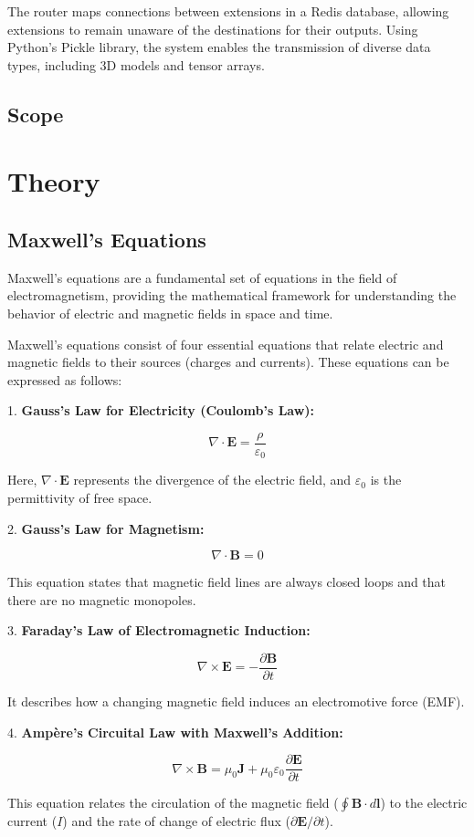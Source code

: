 \documentclass[11pt, a4paper, titlepage]{article}
\begin{document}
The router maps connections between extensions in a Redis database, allowing extensions to remain unaware of the destinations for their outputs. Using Python's Pickle library, the system enables the transmission of diverse data types, including 3D models and tensor arrays.






\newpage

\subsection{Scope}


\iffalse
\section{Theory}
\subsection{Maxwell's Equations}

Maxwell's equations are a fundamental set of equations in the field of electromagnetism, providing the mathematical framework for understanding the behavior of electric and magnetic fields in space and time.

Maxwell's equations consist of four essential equations that relate electric and magnetic fields to their sources (charges and currents). These equations can be expressed as follows:
\begin{center}
	1. \textbf{Gauss's Law for Electricity (Coulomb's Law):}
	
	\[
	\nabla \cdot \mathbf{E} = \frac{\rho}{\varepsilon_0}
	\]
	
	Here, \(\nabla \cdot \mathbf{E}\) represents the divergence of the electric field, and \(\varepsilon_0\) is the permittivity of free space.
\end{center}
\begin{center}
	2. \textbf{Gauss's Law for Magnetism:}
	
	\[
	\nabla \cdot \mathbf{B} = 0
	\]
	
	This equation states that magnetic field lines are always closed loops and that there are no magnetic monopoles.
\end{center}
\begin{center}
	3. \textbf{Faraday's Law of Electromagnetic Induction:}
	
	\[
	\nabla \times \mathbf{E} = -\frac{\partial \mathbf{B}}{\partial t}
	\]
	
	It describes how a changing magnetic field induces an electromotive force (EMF).
\end{center}
\begin{center}
	4. \textbf{Ampère's Circuital Law with Maxwell's Addition:}
	
	\[
	\nabla \times \mathbf{B} = \mu_0 \mathbf{J} + \mu_0 \varepsilon_0 \frac{\partial \mathbf{E}}{\partial t}
	\]
	
	This equation relates the circulation of the magnetic field (\(\oint \mathbf{B} \cdot d\mathbf{l}\)) to the electric current (\(I\)) and the rate of change of electric flux (\(\partial \mathbf{E}/\partial t\)). 
\end{center}
\end{document}
